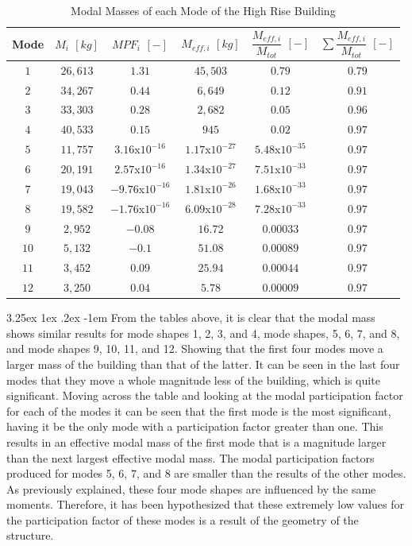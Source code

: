 \documentclass[11pt,a4paper,titlepage]{report}
\makeatletter
\renewcommand\paragraph{\@startsection{paragraph}{5}{\z@}%
  {3.25ex \@plus1ex \@minus.2ex}%
  {-1em}%
  {\normalfont\normalsize\bfseries}}
\makeatother
\begin{document}
 \begin{table}[h]
 \begin{small}
    \centering
    \begin{tabular}{c|c|c|c|c|c}
        Mode & $M_i$ $[kg]$ & $MPF_i$ $[-]$ & $M_{eff,i}$ $[kg]$ & $\dfrac{M_{eff,i}}{M_{tot}}$ $[-]$ & $\sum\dfrac{M_{eff,i}}{M_{tot}}$ $[-]$\\
        \hline
        $1$ & $26,613$ & $1.31$ & $45,503$ & $0.79$ & $0.79$\\
       $2$ & $34,267$ & $0.44$ & $6,649$ & $0.12$ & $0.91$\\
       $3$ & $33,303$ & $0.28$ & $2,682$ & $0.05$ & $0.96$\\
       $4$ & $40,533$ & $0.15$ & $945$ & $0.02$ & $0.97$\\
        $5$ & $11,757$ & $3.16$x$10^{-16}$ & $1.17$x$10^{-27}$ & $5.48$x$10^{-35}$ & $0.97$\\
       $6$ & $20,191$ & $2.57$x$10^{-16}$ & $1.34$x$10^{-27}$ & $7.51$x$10^{-33}$ & $0.97$\\
       $7$ & $19,043$ & $-9.76$x$10^{-16}$ & $1.81$x$10^{-26}$ & $1.68$x$10^{-33}$ & $0.97$\\
       $8$ & $19,582$ & $-1.76$x$10^{-16}$ & $6.09$x$10^{-28}$ & $7.28$x$10^{-33}$ & $0.97$\\
        $9$ & $2,952$ & $-0.08$ & $16.72$ & $0.00033$ & $0.97$\\
       $10$ & $5,132$ & $-0.1$ & $51.08$ & $0.00089$ & $0.97$\\
       $11$ & $3,452$ & $0.09$ & $25.94$ & $0.00044$ & $0.97$\\
       $12$ & $3,250$ & $0.04$ & $5.78$ & $0.00009$ & $0.97$\\
    \end{tabular}
    \caption{Modal Masses of each Mode of the High Rise Building}
    \label{tab:low rise - modal properties y}
\end{small}
\end{table}
\paragraph{}From the tables above, it is clear that the modal mass shows similar results for mode shapes 1, 2, 3, and 4, mode shapes, 5, 6, 7, and 8, and mode shapes 9, 10, 11, and 12. Showing that the first four modes move a larger mass of the building than that of the latter. It can be seen in the last four modes that they move a whole magnitude less of the building, which is quite significant. Moving across the table and looking at the modal participation factor for each of the modes it can be seen that the first mode is the most significant, having it be the only mode with a participation factor greater than one. This results in an effective modal mass of the first mode that is a magnitude larger than the next largest effective modal mass. The modal participation factors produced for modes 5, 6, 7, and 8 are smaller than the results of the other modes. As previously explained, these four mode shapes are influenced by the same moments. Therefore, it has been hypothesized that these extremely low values for the participation factor of these modes is a result of the geometry of the structure. 
\end{document}
